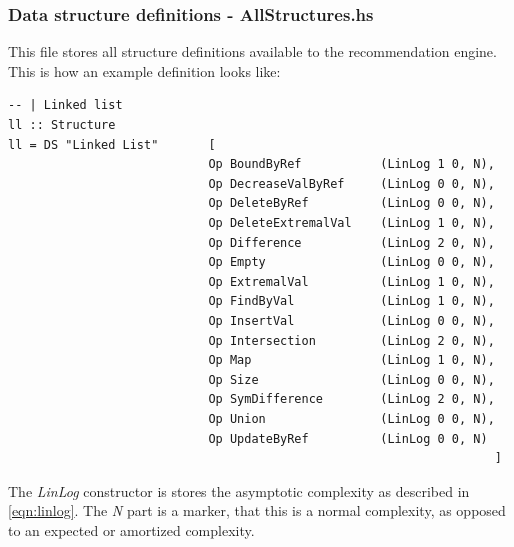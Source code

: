 \documentclass[a4paper,11pt]{article}
\begin{document}
\begin{appendices}
		\subsubsection{Data structure definitions - AllStructures.hs} \label{sec:all-structures-impl}
		This file stores all structure definitions available to the recommendation engine. 
		This is how an example definition looks like:
\begin{verbatim}
-- | Linked list
ll :: Structure
ll = DS "Linked List"       [
                            Op BoundByRef           (LinLog 1 0, N),
                            Op DecreaseValByRef     (LinLog 0 0, N),
                            Op DeleteByRef          (LinLog 0 0, N),
                            Op DeleteExtremalVal    (LinLog 1 0, N),
                            Op Difference           (LinLog 2 0, N),
                            Op Empty                (LinLog 0 0, N),
                            Op ExtremalVal          (LinLog 1 0, N),
                            Op FindByVal            (LinLog 1 0, N),
                            Op InsertVal            (LinLog 0 0, N),
                            Op Intersection         (LinLog 2 0, N),
                            Op Map                  (LinLog 1 0, N),
                            Op Size                 (LinLog 0 0, N),
                            Op SymDifference        (LinLog 2 0, N),
                            Op Union                (LinLog 0 0, N),
                            Op UpdateByRef          (LinLog 0 0, N)
                                                                    ]
\end{verbatim}
		The \emph{LinLog} constructor is stores the asymptotic complexity as described in 
		\autoref{eqn:linlog}. The \emph{N} part is a marker, that this is a normal complexity,
		as opposed to an expected or amortized complexity.
		

\end{appendices}
\end{document}
